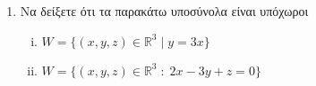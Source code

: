\begin{enumerate}
    \item Να δείξετε ότι τα παρακάτω υποσύνολα είναι υπόχωροι
        \begin{enumerate}[(i)]
            \item $ W = \{ (x,y,z) \in \mathbb{R}^{3} \mid y = 3x \} $ 
            \item $ W = \{(x,y,z)\in \mathbb{R}^{3} \; : \; 2x-3y+z=0 \} $
        \end{enumerate}
\end{enumerate}



